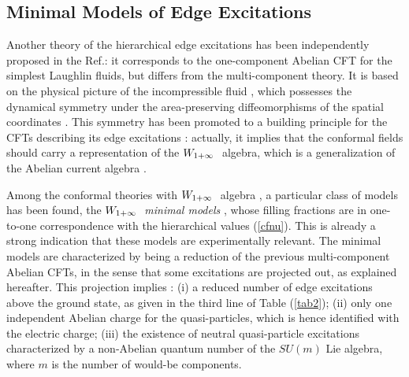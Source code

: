 
\subsection{Minimal Models of Edge Excitations}

Another theory of the hierarchical edge excitations has been
independently proposed in the Ref.\cite{ctz5}: 
it corresponds to the one-component Abelian CFT for the simplest
Laughlin fluids, but differs from the multi-component theory.
It is based on the physical picture of the incompressible 
fluid \cite{laugh}, which possesses the dynamical symmetry under the
area-preserving diffeomorphisms of the spatial coordinates \cite{ctz1}
\cite{sakita}.
This symmetry has been promoted to a building principle for the
CFTs describing its edge excitations \cite{ctz3}: actually, it implies
that the conformal fields should carry a representation of
the $W_{1+\infty}\ $ algebra, which is a generalization of the 
Abelian current algebra \cite{kac}.

Among the conformal theories with $W_{1+\infty}\ $ algebra 
\cite{ctz3}, a particular class of models has been found, the 
$W_{1+\infty}\ $ {\it minimal models} \cite{ctz5}, 
whose filling fractions are in one-to-one 
correspondence with the hierarchical values (\ref{cfnu}).
This is already a strong indication that these models are
experimentally relevant.
The minimal models are characterized by being a reduction
of the previous multi-component Abelian CFTs, in the sense that some
excitations are projected out, as explained hereafter.
This projection implies \cite{ctz5}: (i) a reduced number of edge
excitations above the ground state, as given in the third
line of Table (\ref{tab2}); (ii) only one independent
Abelian charge for the quasi-particles, which is hence identified with
the electric charge; (iii) the existence of neutral quasi-particle 
excitations characterized by
a non-Abelian quantum number of the $SU(m)$ Lie algebra, where $m$ 
is the number of would-be components.

